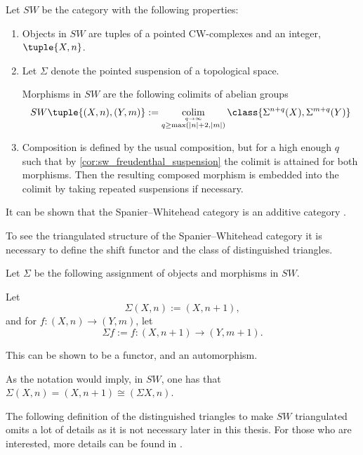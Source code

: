 \begin{definition}
    \label{def:sw-cat}
    Let \( SW \) be the category with the following properties:
    \begin{enumerate}
        \item {
            Objects in \( SW \) are tuples of a pointed CW-complexes and an integer, \( \tuple{X, n} \).
        }
        \item {
            Let \( \Sigma \) denote the pointed suspension of a topological space.

            Morphisms in \( SW \) are the following colimits of abelian groups
            \[
                SW\tuple{ (X, n), (Y, m) } := \colim_{\stackrel{q \to \infty}{q \geq \max(|n| + 2, |m|)}} \class{ \Sigma^{n + q}(X), \Sigma^{m + q}(Y) }
            \]
        }
        \item {
            Composition is defined by the usual composition, but for a high enough \( q \) such that by \autoref{cor:sw_freudenthal_suspension} the colimit is attained for both morphisms. Then the resulting composed morphism is embedded into the colimit by taking repeated suspensions if necessary.
        }
    \end{enumerate}
\end{definition}

It can be shown that the Spanier--Whitehead category is an additive category \cite[Proposition 5.7]{Daria_Bachelor}.

To see the triangulated structure of the Spanier--Whitehead category it is necessary to define the shift functor and the class of distinguished triangles.

\begin{definition}
    \label{def:sw-shift}
    Let \( \Sigma \) be the following assignment of objects and morphisms in \( SW \).

    Let
    \[
        \Sigma(X, n) := (X, n + 1),
    \] 
    and for \( f: (X, n) \to (Y, m) \), let
    \[
        \Sigma f := f: (X, n + 1) \to (Y, m + 1).
    \]

    This can be shown to be a functor, and an automorphism. %
\end{definition}

As the notation would imply, in \( SW \), one has that \( \Sigma(X, n) = (X, n + 1) \cong ( \Sigma X, n ) \).

The following definition of the distinguished triangles to make \( SW \) triangulated omits a lot of details as it is not necessary later in this thesis. For those who are interested, more details can be found in \cite[Definition 5.8, Definition 4.7]{Daria_Bachelor}.

